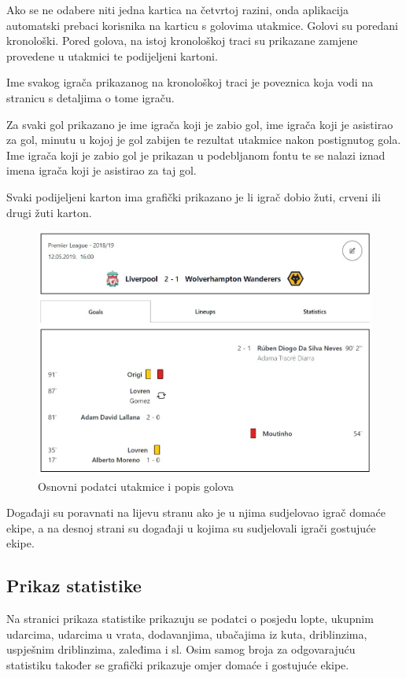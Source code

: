 \documentclass[times, utf8, zavrsni]{fer}
\begin{document}
Ako se ne odabere niti jedna kartica na četvrtoj razini, onda aplikacija automatski prebaci korisnika na karticu s golovima utakmice.
Golovi su poredani kronološki. Pored golova, na istoj kronološkoj traci su prikazane zamjene provedene u utakmici te podijeljeni kartoni.

Ime svakog igrača prikazanog na kronološkoj traci je poveznica koja vodi na stranicu s detaljima o tome igraču.

Za svaki gol prikazano je ime igrača koji je zabio gol, ime igrača koji je asistirao za gol, minutu u kojoj je gol zabijen te rezultat utakmice nakon postignutog gola.
Ime igrača koji je zabio gol je prikazan u podebljanom fontu te se nalazi iznad imena igrača koji je asistirao za taj gol.

Svaki podijeljeni karton ima grafički prikazano je li igrač dobio žuti, crveni ili drugi žuti karton.

\begin{figure}[htb]
\centering
\includegraphics[width=12cm]{images/goals.jpg}
\caption{Osnovni podatci utakmice i popis golova}
\label{fig:goals}
\end{figure}

Događaji su poravnati na lijevu stranu ako je u njima sudjelovao igrač domaće ekipe, a na desnoj strani su događaji u kojima su sudjelovali igrači gostujuće ekipe.

\subsection{Prikaz statistike}

Na stranici prikaza statistike prikazuju se podatci o posjedu lopte, ukupnim udarcima, udarcima u vrata, dodavanjima, ubačajima iz kuta, driblinzima, uspješnim driblinzima, zaleđima i sl.
Osim samog broja za odgovarajuću statistiku također se grafički prikazuje omjer domaće i gostujuće ekipe.
\end{document}
